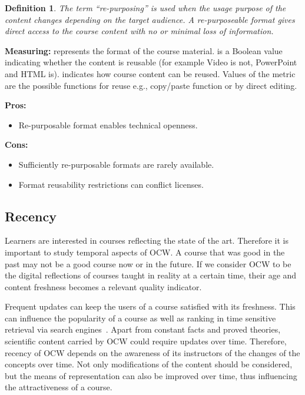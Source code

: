 \documentclass{sig-alternate}
\theoremstyle{definition}
\newtheorem{defn}{Definition}
\begin{document}
\begin{defn}
\emph {The term ``re-purposing'' is used when the usage purpose of the content changes depending on the target audience.
A re-purposeable format gives direct access to the course content with no or minimal loss of information.}
\end{defn}

\noindent\textbf{Measuring:}
 represents the format of the course material.
 is a Boolean value indicating whether the content is reusable (for example Video is not, PowerPoint and HTML is).
 indicates how course content can be reused.
Values of the metric are the possible functions for reuse e.g., copy/paste function or by direct editing.

\noindent\textbf{Pros:}
\begin{itemize}
\item Re-purposable format enables technical openness.
\end{itemize}
\noindent\textbf{Cons:}
\begin{itemize}
\item Sufficiently re-purposable formats are rarely available.
\item Format reusability restrictions can conflict licenses.
\end{itemize}

\subsection{Recency}
\label{sec:Recency}
Learners are interested in courses reflecting the state of the art.
Therefore it is important to study temporal aspects of OCW.
A course that was good in the past may not be a good course now or in the future.
If we consider OCW to be the digital reflections of courses taught in reality at a certain time, their age and content freshness becomes a relevant quality indicator.


Frequent updates can keep the users of a course satisfied with its freshness.
This can influence the popularity of a course as well as ranking in time sensitive retrieval via search engines~\parencite{Dong.2010}.
Apart from constant facts and proved theories, scientific content carried by OCW could require updates over time.
Therefore, recency of OCW depends on the awareness of its instructors of the changes of the concepts over time.
Not only modifications of the content should be considered, but the means of representation can also be improved over time, thus influencing the attractiveness of a course.
\end{document}
